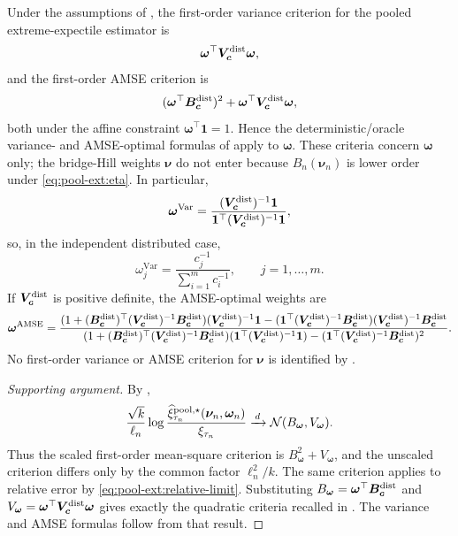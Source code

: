 \begin{conjecture}
\label{conj:pool-ext:omega-criteria}
Under the assumptions of , the
first-order variance criterion for the pooled extreme-expectile estimator is
\[
  \bm\omega^\top\bm{V}_{\bm{c}}^{\mathrm{dist}}\bm\omega,
\]
and the first-order AMSE criterion is
\[
  (\bm\omega^\top\bm{B}_{\bm{c}}^{\mathrm{dist}})^2
  +
  \bm\omega^\top\bm{V}_{\bm{c}}^{\mathrm{dist}}\bm\omega,
\]
both under the affine constraint \(\bm\omega^\top\bm 1=1\). Hence the
deterministic/oracle variance- and AMSE-optimal formulas of
\textcite{DaouiaPadoanStupfler2021} apply to \(\bm\omega\). These criteria
concern \(\bm\omega\) only; the bridge-Hill weights \(\bm\nu\) do not enter
because \(B_n(\bm\nu_n)\) is lower order under \eqref{eq:pool-ext:eta}. In
particular,
\[
  \bm\omega^{\mathrm{Var}}
  =
  \frac{(\bm{V}_{\bm{c}}^{\mathrm{dist}})^{-1}\bm 1}
       {\bm 1^\top(\bm{V}_{\bm{c}}^{\mathrm{dist}})^{-1}\bm 1},
\]
so, in the independent distributed case,
\[
  \omega_j^{\mathrm{Var}}
  =
  \frac{c_j^{-1}}{\sum_{i=1}^{m}c_i^{-1}},
  \qquad j=1,\ldots,m.
\]
If \(\bm{V}_{\bm{c}}^{\mathrm{dist}}\) is positive definite, the AMSE-optimal weights are
\[
  \bm\omega^{\mathrm{AMSE}}
  =
  \frac{
    (1+(\bm{B}_{\bm{c}}^{\mathrm{dist}})^\top
        (\bm{V}_{\bm{c}}^{\mathrm{dist}})^{-1}\bm{B}_{\bm{c}}^{\mathrm{dist}})
        (\bm{V}_{\bm{c}}^{\mathrm{dist}})^{-1}\bm 1
    -
    (\bm 1^\top(\bm{V}_{\bm{c}}^{\mathrm{dist}})^{-1}\bm{B}_{\bm{c}}^{\mathrm{dist}})
        (\bm{V}_{\bm{c}}^{\mathrm{dist}})^{-1}\bm{B}_{\bm{c}}^{\mathrm{dist}}
  }{
    (1+(\bm{B}_{\bm{c}}^{\mathrm{dist}})^\top
        (\bm{V}_{\bm{c}}^{\mathrm{dist}})^{-1}\bm{B}_{\bm{c}}^{\mathrm{dist}})
        (\bm 1^\top(\bm{V}_{\bm{c}}^{\mathrm{dist}})^{-1}\bm 1)
    -
    (\bm 1^\top(\bm{V}_{\bm{c}}^{\mathrm{dist}})^{-1}\bm{B}_{\bm{c}}^{\mathrm{dist}})^2
  }.
\]
No first-order variance or AMSE criterion for \(\bm\nu\) is identified by
.
\end{conjecture}

\begin{proof}[Supporting argument]
By ,
\[
  \frac{\sqrt{k}}{\ell_n}
  \log
  \frac{
    \widehat\xi_{\tau_n}^{\mathrm{pool},\star}(\bm\nu_n,\bm\omega_n)
  }{\xi_{\tau_n}}
  \xrightarrow{\,d\,}
  \mathcal N(B_{\bm\omega},V_{\bm\omega}).
\]
Thus the scaled first-order mean-square criterion is
\(B_{\bm\omega}^2+V_{\bm\omega}\), and the unscaled criterion differs only by
the common factor \(\ell_n^2/k\). The same criterion applies to relative error
by \eqref{eq:pool-ext:relative-limit}. Substituting
\(B_{\bm\omega}=\bm\omega^\top\bm{B}_{\bm{c}}^{\mathrm{dist}}\) and
\(V_{\bm\omega}=\bm\omega^\top\bm{V}_{\bm{c}}^{\mathrm{dist}}\bm\omega\) gives exactly the
quadratic criteria recalled in . The variance
and AMSE formulas follow from that result.
\end{proof}

